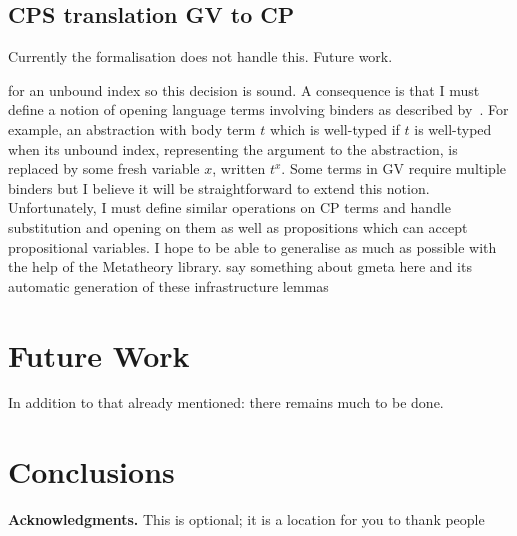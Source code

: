 \documentclass{mpaper}
\begin{document}
\subsection{CPS translation GV to CP}

Currently the formalisation does not handle this. Future work.

for an unbound index so this decision is sound. A consequence is that I must
define a notion of opening language terms involving binders as described
by~\citeauthor{Aydemir:2008:EFM}. For example, an abstraction with body term
$t$ which is well-typed if $t$ is well-typed when its unbound index,
representing the argument to the abstraction, is replaced by some fresh
variable $x$, written $t^x$. Some terms in GV require multiple binders but I
believe it will be straightforward to extend this notion. Unfortunately, I
must define similar operations on CP terms and handle substitution and opening
on them as well as propositions which can accept propositional variables. I
hope to be able to generalise as much as possible with the help of the
Metatheory library. say something about gmeta here and its automatic
generation of these infrastructure lemmas

\section{Future Work}

In addition to that already mentioned: there remains much to be done.

\section{Conclusions}


{\bf Acknowledgments.}
This is optional; it is a location for you to thank people

\end{document}
